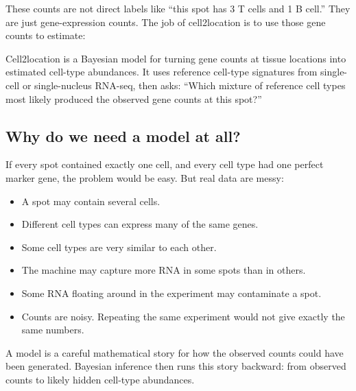 \documentclass[11pt]{article}
\begin{document}
These counts are not direct labels like ``this spot has 3 T cells and 1 B cell.'' They are just gene-expression counts. The job of cell2location is to use those gene counts to estimate:

\begin{center}
\end{center}

\begin{bigidea}
Cell2location is a Bayesian model for turning gene counts at tissue locations into estimated cell-type abundances. It uses reference cell-type signatures from single-cell or single-nucleus RNA-seq, then asks: ``Which mixture of reference cell types most likely produced the observed gene counts at this spot?''
\end{bigidea}

\subsection{Why do we need a model at all?}

If every spot contained exactly one cell, and every cell type had one perfect marker gene, the problem would be easy. But real data are messy:

\begin{itemize}
  \item A spot may contain several cells.
  \item Different cell types can express many of the same genes.
  \item Some cell types are very similar to each other.
  \item The machine may capture more RNA in some spots than in others.
  \item Some RNA floating around in the experiment may contaminate a spot.
  \item Counts are noisy. Repeating the same experiment would not give exactly the same numbers.
\end{itemize}

A model is a careful mathematical story for how the observed counts could have been generated. Bayesian inference then runs this story backward: from observed counts to likely hidden cell-type abundances.
\end{document}
